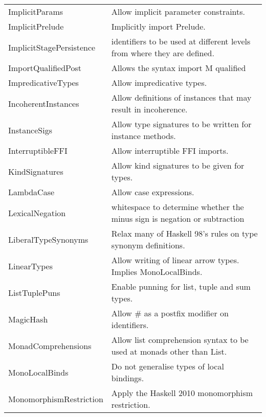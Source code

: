 \documentclass[openany, 12pt]{book}
\begin{document}
\begin{center}
\begin{supertabular}{ll}
		ImplicitParams             & Allow implicit parameter constraints.                                      \\
		ImplicitPrelude            & Implicitly import Prelude.                                                 \\
		ImplicitStagePersistence   & identifiers to be used at different levels from where they are defined.    \\
		ImportQualifiedPost        & Allows the syntax import M qualified                                       \\
		ImpredicativeTypes         & Allow impredicative types.                                                 \\
		IncoherentInstances        & Allow definitions of instances that may result in incoherence.             \\
		InstanceSigs               & Allow type signatures to be written for instance methods.                  \\
		InterruptibleFFI           & Allow interruptible FFI imports.                                           \\
		KindSignatures             & Allow kind signatures to be given for types.                               \\
		LambdaCase                 & Allow case expressions.                                                    \\
		LexicalNegation            & whitespace to determine whether the minus sign is negation or subtraction  \\
		LiberalTypeSynonyms        & Relax many of Haskell 98's rules on type synonym definitions.              \\
		LinearTypes                & Allow writing of linear arrow types. Implies MonoLocalBinds.               \\
		ListTuplePuns              & Enable punning for list, tuple and sum types.                              \\
		MagicHash                  & Allow \# as a postfix modifier on identifiers.                             \\
		MonadComprehensions        & Allow list comprehension syntax to be used at monads other than List.      \\
		MonoLocalBinds             & Do not generalise types of local bindings.                                 \\
		MonomorphismRestriction    & Apply the Haskell 2010 monomorphism restriction.                           \\

\end{supertabular}
\end{center}
\end{document}
